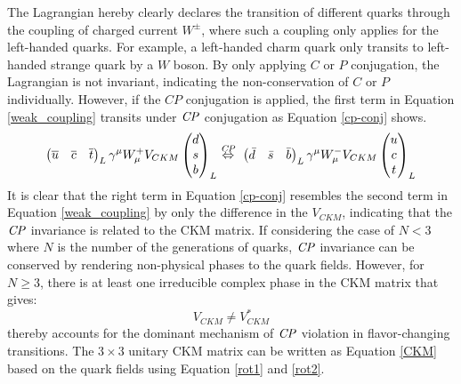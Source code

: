 
The Lagrangian hereby clearly declares the transition of different quarks through the coupling of charged current $W^{\pm}$, where such a coupling only applies for the left-handed quarks. For example, a left-handed charm quark only transits to left-handed strange quark by a $W$ boson. By only applying $C$ or $P$ conjugation, the Lagrangian is not invariant, indicating the non-conservation of $C$ or $P$ individually. However, if the $CP$ conjugation is applied, the first term in Equation \ref{weak_coupling} transits under $\it{CP}$ conjugation as Equation \ref{cp-conj} shows.
\begin{equation}\label{cp-conj}
\begin{pmatrix}
\overline{u}&\overline{c}&\overline{t}
\end{pmatrix}_L
\gamma^\mu W^{+}_{\mu}
V_{CKM}
\begin{pmatrix}
d\\s\\b\\
\end{pmatrix}_L
\overset{\it{CP}}{\Leftrightarrow}~
\begin{pmatrix}
{\bar{d}}&{\bar{s}}&{\bar{b}}
\end{pmatrix}_L
\gamma^\mu W^{-}_{\mu}
{V_{CKM}}
\begin{pmatrix}
u\\c\\t\\
\end{pmatrix}_L
\end{equation} 
It is clear that the right term in Equation \ref{cp-conj} resembles the second term in Equation \ref{weak_coupling} by only the difference in the $V_{CKM}$, indicating that the $\it{CP}$ invariance is related to the CKM matrix. If considering the case of $N<3$ where $N$ is the number of the generations of quarks, $\it{CP}$ invariance can be conserved by rendering non-physical phases to the quark fields. However, for $N\geq3$, there is at least one irreducible complex phase in the CKM matrix that gives: 
\begin{equation}
	V_{CKM} \neq V_{CKM}^{*}
\end{equation}
thereby accounts for the dominant mechanism of $\it{CP}$ violation in flavor-changing transitions. The $3\times 3$ unitary CKM matrix can be written as Equation \ref{CKM} based on the quark fields using Equation \ref{rot1} and \ref{rot2}.

